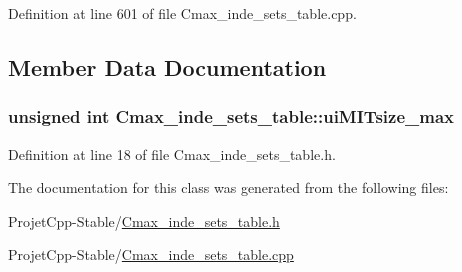 Definition at line 601 of file Cmax\+\_\+inde\+\_\+sets\+\_\+table.\+cpp.



\subsection{Member Data Documentation}
\hypertarget{class_cmax__inde__sets__table_a9a847269f6dfaca3ce1c292fc31171cf}{}
\subsubsection[{ui\+M\+I\+Tsize\+\_\+max}]{\setlength{\rightskip}{0pt plus 5cm}unsigned int Cmax\+\_\+inde\+\_\+sets\+\_\+table\+::ui\+M\+I\+Tsize\+\_\+max\hspace{0.3cm}{\ttfamily [private]}}\label{class_cmax__inde__sets__table_a9a847269f6dfaca3ce1c292fc31171cf}


Definition at line 18 of file Cmax\+\_\+inde\+\_\+sets\+\_\+table.\+h.



The documentation for this class was generated from the following files\+:\begin{DoxyCompactItemize}
\item 
Projet\+Cpp-\/\+Stable/\hyperlink{_cmax__inde__sets__table_8h}{Cmax\+\_\+inde\+\_\+sets\+\_\+table.\+h}\item 
Projet\+Cpp-\/\+Stable/\hyperlink{_cmax__inde__sets__table_8cpp}{Cmax\+\_\+inde\+\_\+sets\+\_\+table.\+cpp}\end{DoxyCompactItemize}
